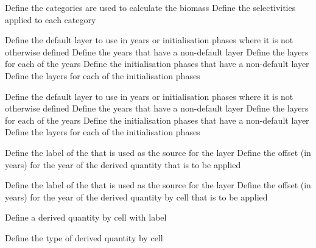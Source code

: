 \par\textbf{}\par
{} {Define the categories are used to calculate the biomass}
 {Define the selectivities applied to each category}
\par\textbf{}\par
{} {Define the default layer to use in years or initialisation phases where it is not otherwise defined}
 {Define the years that have a non-default layer}
 {Define the layers for each of the years}
 {Define the initialisation phases that have a non-default layer}
 {Define the layers for each of the initialisation phases}
\par\textbf{}\par
{} {Define the default layer to use in years or initialisation phases where it is not otherwise defined}
 {Define the years that have a non-default layer}
 {Define the layers for each of the years}
 {Define the initialisation phases that have a non-default layer}
 {Define the layers for each of the initialisation phases}
\par\textbf{}\par
{} {Define the label of the  that is used as the source for the layer}
 {Define the offset (in years) for the year of the derived quantity that is to be applied}
\par\textbf{}\par
{} {Define the label of the  that is used as the source for the layer}
 {Define the offset (in years) for the year of the derived quantity by cell that is to be applied}
\par{} {Define a derived quantity by cell with label}\par
{} {Define the type of derived quantity by cell}
\par\textbf{}\par
